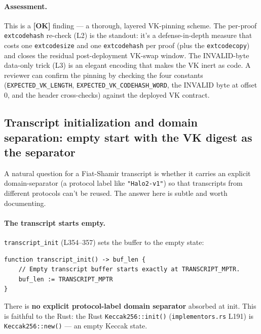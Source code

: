 \paragraph{Assessment.} This is a \textcolor{tracegreen}{\textbf{[OK]}}
finding --- a thorough, layered VK-pinning scheme. The per-proof
\texttt{extcodehash} re-check (L2) is the standout: it's a
defense-in-depth measure that costs one \texttt{extcodesize} and one
\texttt{extcodehash} per proof (plus the \texttt{extcodecopy}) and
closes the residual post-deployment VK-swap window. The
INVALID-byte data-only trick (L3) is an elegant encoding that makes
the VK inert as code. A reviewer can confirm the pinning by
checking the four constants (\texttt{EXPECTED\_\allowbreak{}VK\_\allowbreak{}LENGTH},
\texttt{EXPECTED\_\allowbreak{}VK\_\allowbreak{}CODEHASH\_\allowbreak{}WORD}, the INVALID byte at offset
0, and the header cross-checks) against the deployed VK contract.

\subsection{Transcript initialization and domain separation: empty start with the VK digest as the separator}
\label{sec:pr-domain}

A natural question for a Fiat-Shamir transcript is whether it
carries an explicit domain-separator (a protocol label like
\texttt{"Halo2-v1"}) so that transcripts from different protocols
can't be reused. The answer here is subtle and worth documenting.

\paragraph{The transcript starts empty.} \texttt{transcript\_init}
(L354--357) sets the buffer to the empty state:
\begin{lstlisting}[style=yul]
function transcript_init() -> buf_len {
    // Empty transcript buffer starts exactly at TRANSCRIPT_MPTR.
    buf_len := TRANSCRIPT_MPTR
}
\end{lstlisting}
There is \textbf{no explicit protocol-label domain separator}
absorbed at init. This is faithful to the Rust: the Rust
\texttt{Keccak256::init()} (\texttt{implementors.rs} L191) is
\texttt{Keccak256::new()} --- an empty Keccak state.


